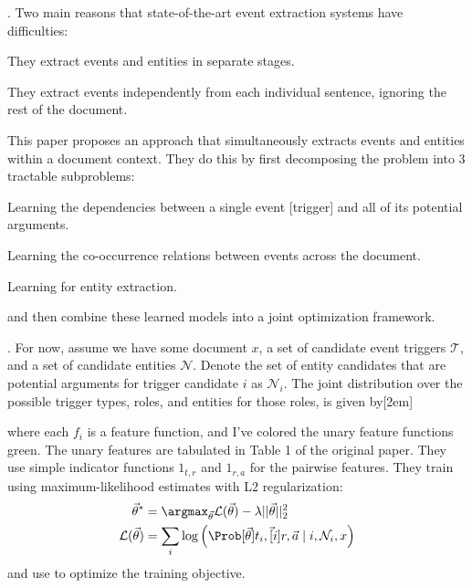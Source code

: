 \documentclass[11pt]{article}
\begin{document}
\p {}. Two main reasons that state-of-the-art event extraction systems have difficulties: 
\begin{compactenum}
	\item They extract events and entities in separate stages. 
	\item They extract events independently from each individual sentence, ignoring the rest of the document. 
\end{compactenum}
This paper proposes an approach that simultaneously extracts events and entities within a document context. They do this by first decomposing the problem into 3 tractable subproblems:
\begin{compactenum}
	\item Learning the dependencies between a single event [trigger] and all of its potential arguments.
	\item Learning the co-occurrence relations between events across the document.
	\item Learning for entity extraction.
\end{compactenum} 
and then combine these learned models into a joint optimization framework. 

\myspace
\p {}. For now, assume we have some document $x$, a set of candidate event triggers $\mathcal{T}$, and a set of candidate entities $\mathcal{N}$. Denote the set of entity candidates that are potential arguments for trigger candidate $i$ as $\mathcal{N}_i$. The joint distribution over the possible trigger types, roles, and entities for those roles, is given by[2em]

where each $f_i$ is a feature function, and I've colored the unary feature functions green. The unary features are tabulated in Table 1 of the original paper. They use simple indicator functions $1_{t,r}$ and $1_{r, a}$ for the pairwise features. They train using maximum-likelihood estimates with L2 regularization:
\begin{align}
\vec{\theta}^* &= \argmax_{\vec\theta} \mathcal{L}(\vec\theta) - \lambda ||\vec\theta||_2^2 \\
\mathcal{L}(\vec\theta) &= \sum_i \log \left( \Prob[\vec{\theta}]{ t_i, \vec[i]{r}, \vec{a} \mid i, \mathcal{N}_i, x } \right)
\end{align}
and use  to optimize the training objective. 
\end{document}
